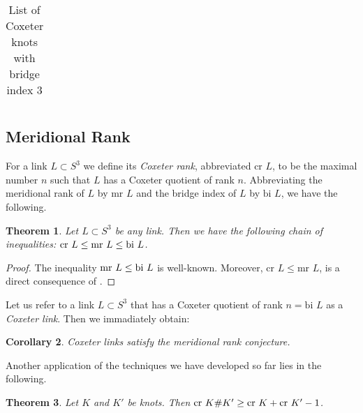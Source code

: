 \documentclass{article}
\newtheorem{theorem}{Theorem}[section]
\newtheorem{corollary}[theorem]{Corollary}
\theoremstyle{definition}
\begin{document}
\begin{table}[htb]
\begin{tabular}{c|c}
\end{tabular}
\caption{List of Coxeter knots with bridge index $3$}
\end{table}

\subsection{Meridional Rank}\label{subsec:meridional-rank}
For a link $L \subset S^3$ we define its \textit{Coxeter rank}, abbreviated $\text{cr } L$, to be the maximal number $n$ such that $L$ has a Coxeter quotient of rank $n$. Abbreviating the meridional rank of $L$ by $\text{mr }L$ and the bridge index of $L$ by $\text{bi } L$, we have the following.

\begin{theorem}
Let $L \subset S^3$ be any link. Then we have the following chain of inequalities: $\textup{cr }L \leq \textup{mr }L \leq \textup{bi } L$.
\end{theorem}

\begin{proof}
The inequality $\textup{mr } L \leq \text{bi } L$ is well-known. Moreover, $\text{cr } L \leq \text{mr } L$, is a direct consequence of \cite[Lemma 2.1]{felikson2009}.
\end{proof}

Let us refer to a link $L \subset S^3$ that has a Coxeter quotient of rank $n = \text{bi } L$ as a \textit{Coxeter link}. Then we immadiately obtain:

\begin{corollary}\label{cor:coxeter-links-meridional-rank}
Coxeter links satisfy the meridional rank conjecture.
\end{corollary}

Another application of the techniques we have developed so far lies in the following.

\begin{theorem}\label{thm:connected-sums-coxeter-rank}
Let $K$ and $K'$ be knots. Then $\textup{cr } K\#K' \geq \textup{cr } K + \textup{cr } K' - 1$.
\end{theorem}
\end{document}
